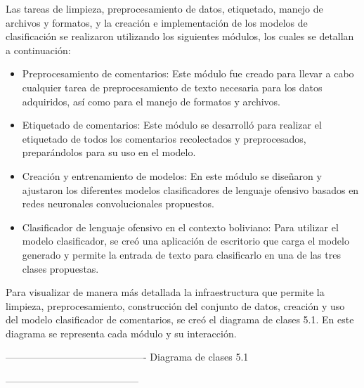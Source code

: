 Las tareas de limpieza, preprocesamiento de datos, etiquetado, manejo de archivos y formatos, y la creación e implementación de los modelos de clasificación se realizaron utilizando los siguientes módulos, los cuales se detallan a continuación:

\begin{itemize}
	\item	Preprocesamiento de comentarios: Este módulo fue creado para llevar a cabo cualquier tarea de preprocesamiento de texto necesaria para los datos adquiridos, así como para el manejo de formatos y archivos.
	
	\item Etiquetado de comentarios: Este módulo se desarrolló para realizar el etiquetado de todos los comentarios recolectados y preprocesados, preparándolos para su uso en el modelo.

	\item Creación y entrenamiento de modelos: En este módulo se diseñaron y ajustaron los diferentes modelos clasificadores de lenguaje ofensivo basados en redes neuronales convolucionales propuestos.
	
	\item Clasificador de lenguaje ofensivo en el contexto boliviano: Para utilizar el modelo clasificador, se creó una aplicación de escritorio que carga el modelo generado y permite la entrada de texto para clasificarlo en una de las tres clases propuestas.

\end{itemize}

Para visualizar de manera más detallada la infraestructura que permite la limpieza, preprocesamiento, construcción del conjunto de datos, creación y uso del modelo clasificador de comentarios, se creó el diagrama de clases 5.1. En este diagrama se representa cada módulo y su interacción.	

-------------------------------------------
Diagrama de clases 5.1

-----------------------------------------